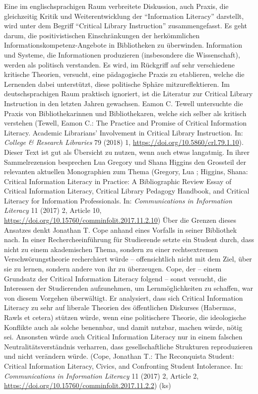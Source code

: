 \documentclass[a4paper,
fontsize=11pt,
oneside,
numbers=noperiodatend,
parskip=half-,
bibliography=totoc,
final
]{scrartcl}
\begin{document}
Eine im englischsprachigen Raum verbreitete Diskussion, auch Praxis, die
gleichzeitig Kritik und Weiterentwicklung der \enquote{Information
Literacy} darstellt, wird unter dem Begriff \enquote{Critical Library
Instruction} zusammengefasst. Es geht darum, die positivistischen
Einschränkungen der herkömmlichen Informationskompetenz-Angebote in
Bibliotheken zu überwinden. Information und Systeme, die Informationen
produzieren (insbesondere die Wissenschaft), werden als politisch
verstanden. Es wird, im Rückgriff auf sehr verschiedene kritische
Theorien, versucht, eine pädagogische Praxis zu etablieren, welche die
Lernenden dabei unterstützt, diese politische Sphäre mitzureflektieren.
Im deutschsprachigen Raum praktisch ignoriert, ist die Literatur zur
Critical Library Instruction in den letzten Jahren gewachsen. Eamon C.
Tewell untersuchte die Praxis von Bibliothekarinnen und Bibliothekaren,
welche sich selber als kritisch verstehen (Tewell, Eamon C.: The
Practice and Promise of Critical Information Literacy. Academic
Librarians' Involvement in Critical Library Instruction. In:
\emph{College \& Research Libraries} 79 (2018) 1,
\url{https://doi.org/10.5860/crl.79.1.10}). Dieser Text ist gut als
Übersicht zu nutzen, wenn auch etwas langatmig. In ihrer Sammelrezension
besprechen Lua Gregory und Shana Higgins den Grossteil der relevanten
aktuellen Monographien zum Thema (Gregory, Lua ; Higgins, Shana:
Critical Information Literacy in Practice: A Bibliographic Review Essay
of Critical Information Literacy, Critical Library Pedagogy Handbook,
and Critical Literacy for Information Professionals. In:
\emph{Communications in Information Literacy} 11 (2017) 2, Article 10,
\url{https://doi.org/10.15760/comminfolit.2017.11.2.10}) Über die
Grenzen dieses Ansatzes denkt Jonathan T. Cope anhand eines Vorfalls in
seiner Bibliothek nach. In einer Rechercheeinführung für Studierende
setzte ein Student durch, dass nicht zu einem akademischen Thema,
sondern zu einer rechtsextremen Verschwörungstheorie recherchiert würde
-- offensichtlich nicht mit dem Ziel, über sie zu lernen, sondern andere
von ihr zu überzeugen. Cope, der -- einem Grundsatz der Critical
Information Literacy folgend -- sonst versucht, die Interessen der
Studierenden aufzunehmen, um Lernmöglichkeiten zu schaffen, war von
diesem Vorgehen überwältigt. Er analysiert, dass sich Critical
Information Literacy zu sehr auf liberale Theorien des öffentlichen
Diskurses (Habermas, Rawls et cetera) stützen würde, wenn eine
politischere Theorie, die ideologische Konflikte auch als solche
benennbar, und damit nutzbar, machen würde, nötig sei. Ansonsten würde
auch Critical Information Literacy nur in einem falschen
Neutralitätsverständnis verharren, dass gesellschaftliche Strukturen
reproduzieren und nicht verändern würde. (Cope, Jonathan T.: The
Reconquista Student: Critical Information Literacy, Civics, and
Confronting Student Intolerance. In: \emph{Communications in Information
Literacy} 11 (2017) 2, Article 2,
\url{https://doi.org/10.15760/comminfolit.2017.11.2.2}) (ks)
\end{document}
